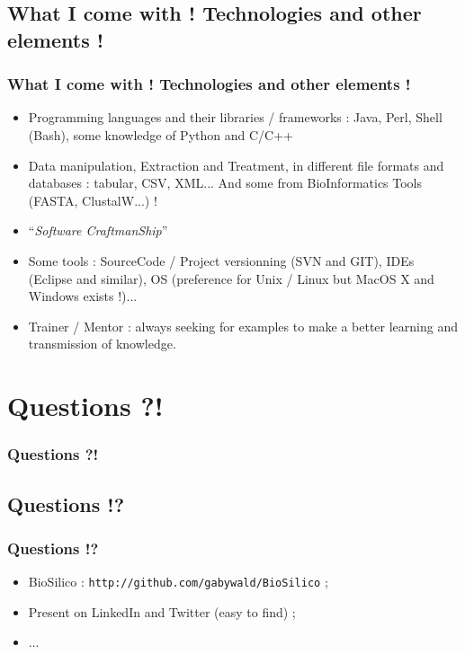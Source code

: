 \documentclass{beamer}
\begin{document}
\def\titleSubSectionPositionPartThree{What I come with ! Technologies and other elements !}
\subsection{ \titleSubSectionPositionPartThree }
\begin{frame}
	\frametitle{ \titleSubSectionPositionPartThree }
	\begin{itemize}
		\item Programming languages and their libraries / frameworks : Java, Perl, Shell (Bash), some knowledge of Python and C/C++
		\item Data manipulation, Extraction and Treatment, in different file formats and databases : tabular, CSV, XML... And some from BioInformatics Tools (FASTA, ClustalW...) !
		\item ``\emph{Software CraftmanShip}'' 
		\item Some tools : SourceCode / Project versionning (SVN and GIT), IDEs (Eclipse and similar), OS (preference for Unix / Linux but MacOS X and Windows exists !)... 
		\item Trainer / Mentor : always seeking for examples to make a better learning and transmission of knowledge. 
	\end{itemize}
\end{frame} 

\def\titleSectionQuestionPart{Questions ?!}
\section{\titleSectionQuestionPart }
\begin{frame}
	\frametitle{\titleSectionQuestionPart }
	\tableofcontents[sections=3,currentsection,subsectionstyle=show/shaded/hide]
\end{frame} 

\def\titleSubSectionMorePart1{Questions !?}
\subsection*{\titleSubSectionMorePart1 }
\begin{frame}
	\frametitle{\titleSubSectionMorePart1 }
	
	\begin{itemize}
		\item BioSilico : \texttt{http://github.com/gabywald/BioSilico} ; 
		\item Present on LinkedIn and Twitter (easy to find) ; 
		\item ... 
	\end{itemize}
	
\end{frame} 
\end{document}
